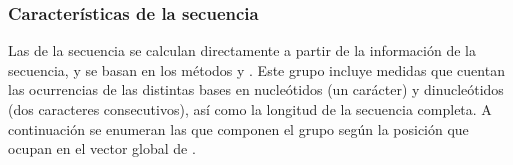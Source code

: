 %
%
\subsubsection{Características de la secuencia}
%
Las  de la secuencia se calculan directamente a partir de la
información de la secuencia, y se basan en los métodos 
\cite{ng} y .
Este grupo incluye medidas que cuentan las ocurrencias de las
distintas bases en nucleótidos (un carácter) y dinucleótidos (dos
caracteres consecutivos), así como la longitud de la secuencia
completa.
A continuación se enumeran las  que componen el grupo según
la posición que ocupan en el vector global de .
